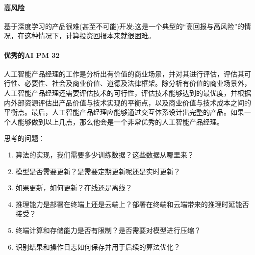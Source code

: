 \documentclass[letterpaper,10pt,english]{sphinxmanual}
\begin{document}


\paragraph{高风险}
\label{\detokenize{chapter_introduction/AI_PM:id40}}
基于深度学习的产品很难(甚至不可能)开发;这是一个典型的“高回报与高风险”的情况，在这种情况下，计算投资回报本来就很困难。


\paragraph{优秀的AI PM 32\sphinxfootnotemark[307]}
\label{\detokenize{chapter_introduction/AI_PM:ai-pm-32}}%
\begin{footnotetext}[307]\sphinxAtStartFootnote
{}
%
\end{footnotetext}\ignorespaces 
人工智能产品经理的工作是分析出有价值的商业场景，并对其进行评估，评估其可行性、必要性、社会及商业价值、道德及法律框架。除分析有价值的商业场景外，人工智能产品经理还需要评估技术的可行性，评估技术能够达到的最优度，并根据内外部资源评估出产品价值与技术实现的平衡点，以及商业价值与技术成本之间的平衡点。最后，人工智能产品经理应能够通过交互体系设计出完整的产品。如果一个人能够做到以上几点，那么他会是一个非常优秀的人工智能产品经理。

思考的问题：%
\begin{footnote}[308]\sphinxAtStartFootnote
{}
%
\end{footnote}
\begin{enumerate}
%
\item {} 
算法的实现，我们需要多少训练数据？这些数据从哪里来？

\item {} 
模型是否需要更新？是需要定期更新呢还是实时更新？

\item {} 
如果更新，如何更新？在线还是离线？

\item {} 
推理能力是部署在终端上还是云端上？部署在终端和云端带来的推理时延能否接受？

\item {} 
终端计算和存储能力是否有限制？是否需要对模型进行压缩？

\item {} 
识别结果和操作日志如何保存并用于后续的算法优化？

\end{enumerate}
\end{document}
